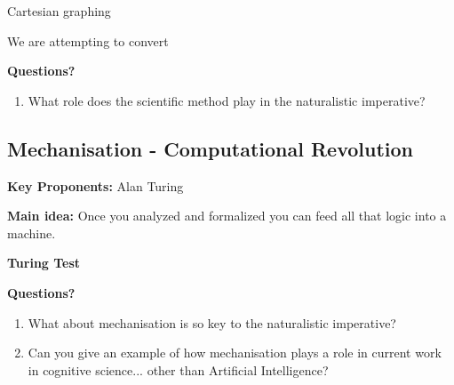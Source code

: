 \documentclass[twoside]{article}
\begin{document}
Cartesian graphing

We are attempting to convert

\textbf{Questions?}
\begin{enumerate}
  \item What role does the scientific method play in the naturalistic imperative?
\end{enumerate}


\subsection{Mechanisation - Computational Revolution}

\textbf{Key Proponents: } Alan Turing

\textbf{Main idea:} Once you analyzed and formalized you can feed all that logic
into a machine.

\textbf{Turing Test}

\textbf{Questions?}
\begin{enumerate}
  \item What about mechanisation is so key to the naturalistic imperative?
  \item Can you give an example of how mechanisation plays a role in current work
        in cognitive science... other than Artificial Intelligence?
\end{enumerate}
\end{document}
